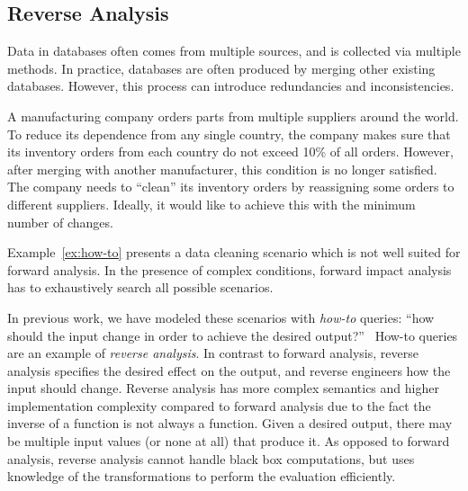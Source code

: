 


\subsection{Reverse Analysis} %
\label{sub:reverse_analysis}

Data in databases often comes from multiple sources, and is collected
via multiple methods.  In practice, databases are often produced by
merging other existing databases. However, this process can introduce
redundancies and inconsistencies.

\begin{example}\label{ex:how-to}
A manufacturing company orders parts from multiple suppliers around
the world. To reduce its dependence from any single country, the
company makes sure that its inventory orders from each country do not
exceed 10\% of all orders. However, after merging with another
manufacturer, this condition is no longer satisfied. The company needs
to ``clean'' its inventory orders by reassigning some orders to
different suppliers. Ideally, it would like to achieve this with the
minimum number of changes.
\end{example}

Example~\ref{ex:how-to} presents a data cleaning scenario which is not
well suited for forward analysis. In the presence of complex
conditions, forward impact analysis has to exhaustively search all
possible scenarios.

In previous work, we have modeled these scenarios with \emph{how-to}
queries: ``how should the input change in order to achieve the desired
output?''~\cite{DBLP:journals/pvldb/MeliouGS11} How-to queries are an
example of \emph{reverse analysis}. In contrast to forward analysis,
reverse analysis specifies the desired effect on the output, and
reverse engineers how the input should change. Reverse analysis has
more complex semantics and higher implementation complexity compared
to forward analysis due to the fact the inverse of a function is not
always a function. Given a desired output, there may be multiple input
values (or none at all) that produce it.  As opposed to forward
analysis, reverse analysis cannot handle black box computations, but
uses knowledge of the transformations to perform the evaluation
efficiently.

